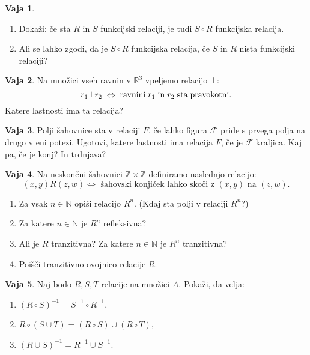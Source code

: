 \documentclass{article}
\newcommand{\ZZ}{\mathbb{Z}}
\theoremstyle{definition}
\newtheorem{vaja}{Vaja}
\begin{document}
\begin{vaja}
\begin{enumerate}
  \item Dokaži: če sta $R$ in $S$ funkcijski relaciji, je tudi $S
  \circ R$ funkcijska relacija.

  \item Ali se lahko zgodi, da je $S \circ R$ funkcijska relacija,
  če $S$ in $R$ nista funkcijski relaciji?  
\end{enumerate}
\end{vaja}

\begin{vaja}
Na množici vseh ravnin v $\mathbb{R}^3$ vpeljemo relacijo $\bot$:
$$r_1\bot r_2\;\Leftrightarrow\;{\rm ravnini\;}r_1\;{\rm in\;}r_2\;{\rm sta\;pravokotni.}$$
Katere lastnosti ima ta relacija?

\end{vaja}

\begin{vaja}
Polji šahovnice sta v relaciji $F$, če lahko figura $\mathcal F$ pride s prvega polja na drugo v eni potezi. Ugotovi, katere lastnosti ima relacija $F$, če je $\mathcal F$ kraljica. Kaj pa, če je konj? In trdnjava?

\end{vaja}

\begin{vaja}
Na neskončni šahovnici $\ZZ \times \ZZ$ definiramo naslednjo relacijo:
\begin{equation*}
(x,y)R(z,w)\Leftrightarrow\text{ šahovski konjiček lahko skoči z }(x,y)\text{ na }(z,w).
\end{equation*}
\begin{enumerate}
\item Za vsak $n\in\mathbb N$ opiši relacijo $R^n$. (Kdaj sta polji v relaciji $R^n$?)
\item Za katere $n\in\mathbb N$ je $R^n$ refleksivna?
\item Ali je $R$ tranzitivna? Za katere $n\in\mathbb N$ je $R^n$ tranzitivna?
\item Poišči tranzitivno ovojnico relacije $R$.
\end{enumerate}
\end{vaja}

\begin{vaja}
Naj bodo $R, S, T$ relacije na množici $A$. Pokaži, da velja:
\begin{enumerate}
\item $(R\circ S)^{-1}=S^{-1}\circ R^{-1}$,
\item $R\circ (S\cup T) = (R\circ S)\cup (R\circ T)$,
\item $(R\cup S)^{-1}=R^{-1}\cup S^{-1}$.
\end{enumerate}
\end{vaja}
\end{document}
